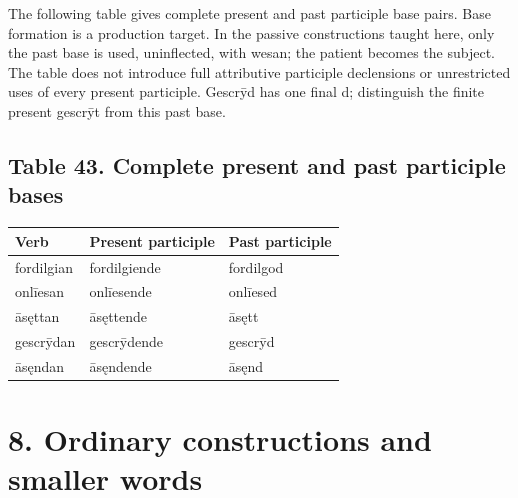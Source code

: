 The following table gives complete present and past participle base pairs. Base formation is a production target. In the passive constructions taught here, only the past base is used, uninflected, with wesan; the patient becomes the subject. The table does not introduce full attributive participle declensions or unrestricted uses of every present participle. Gescrȳd has one final d; distinguish the finite present gescrȳt from this past base.

\subsection*{Table 43. Complete present and past participle bases}

\par\begingroup
\fontsize{10.5}{13.2}\selectfont
\setlength{\LTleft}{0pt}\setlength{\LTright}{\fill}
\noindent
\begin{tabular}{@{}>{\raggedright\arraybackslash}p{32.04mm}>{\raggedright\arraybackslash}p{47.09mm}>{\raggedright\arraybackslash}p{39.25mm}@{}}
\toprule
\textbf{Verb} & \textbf{Present participle} & \textbf{Past participle} \\
\midrule
fordilgian & fordilgiende & fordilgod \\
onlīesan & onlīesende & onlīesed \\
āsęttan & āsęttende & āsętt \\
gescrȳdan & gescrȳdende & gescrȳd \\
āsęndan & āsęndende & āsęnd \\
\bottomrule
\end{tabular}
\par\endgroup

\section*{8. Ordinary constructions and smaller words}

